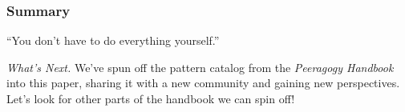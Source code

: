 \subsubsection*{Summary}
``You don't have to do everything yourself.''

\begin{framed}
\noindent 
\emph{What's Next.}
We've spun off the pattern catalog from the \emph{Peeragogy Handbook} into this paper, sharing it with a new community and gaining new perspectives.  Let's look for other parts of the handbook we can spin off!
\end{framed}



    
    
